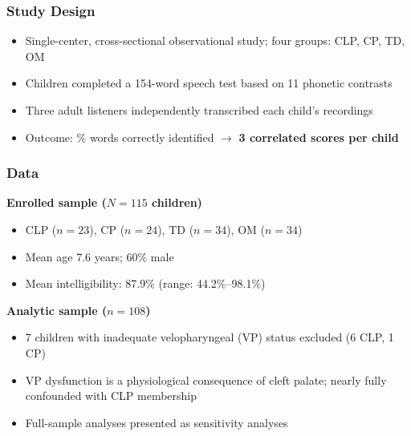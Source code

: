 \documentclass{beamer}
\begin{document}
\begin{frame}
\frametitle{Study Design}
\begin{itemize}
  \item Single-center, cross-sectional observational study; four groups: CLP, CP, TD, OM
  \item Children completed a 154-word speech test based on 11 phonetic contrasts
  \item Three adult listeners independently transcribed each child's recordings
  \item Outcome: \% words correctly identified $\to$ \textbf{3 correlated scores per child}
\end{itemize}
\end{frame}
\begin{frame}
\frametitle{Data}
\textbf{Enrolled sample ($N=115$ children)}
\begin{itemize}
  \item CLP ($n=23$), CP ($n=24$), TD ($n=34$), OM ($n=34$)
  \item Mean age 7.6 years; 60\% male
  \item Mean intelligibility: 87.9\% (range: 44.2\%--98.1\%)
\end{itemize}
\vspace{0.5em}
\textbf{Analytic sample ($n=108$)}
\begin{itemize}
  \item 7 children with inadequate velopharyngeal (VP) status excluded (6 CLP, 1 CP)
  \item VP dysfunction is a physiological consequence of cleft palate; nearly fully confounded with CLP membership
  \item Full-sample analyses presented as sensitivity analyses
\end{itemize}
\end{frame}
\end{document}
